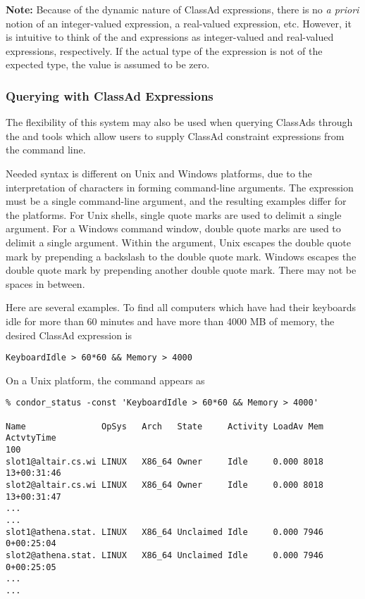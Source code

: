 \textbf{Note:}  Because of the dynamic nature of ClassAd expressions, there
is no \emph{a priori} notion of an integer-valued expression, a real-valued
expression, etc.  However, it is intuitive to think of the 
and  expressions as integer-valued and real-valued expressions,
respectively.  If the actual type of the expression is not of the expected 
type, the value is assumed to be zero.

\subsubsection{\label{sec:classad-query-examples}Querying with ClassAd Expressions}
The flexibility of this system may also be used when querying ClassAds
through the  and  tools which allow users to
supply ClassAd constraint expressions from the command line.

Needed syntax is different on Unix and Windows platforms, 
due to the interpretation of characters in forming command-line arguments.
The expression must be a single command-line argument,
and the resulting examples differ for the platforms.
For Unix shells,
single quote marks are used to delimit a single argument.
For a Windows command window,
double quote marks are used to delimit a single argument.
Within the argument,
Unix escapes the double quote mark by prepending a backslash to the double
quote mark.
Windows escapes the double quote mark by prepending another double
quote mark. There may not be spaces in between.

Here are several examples.
To find all computers which have had their keyboards idle for 
more than 60 minutes and have more than 4000 MB of memory,
the desired ClassAd expression is
\footnotesize
\begin{verbatim}
KeyboardIdle > 60*60 && Memory > 4000
\end{verbatim}
\normalsize
On a Unix platform, the command appears as
\footnotesize
\begin{verbatim}
% condor_status -const 'KeyboardIdle > 60*60 && Memory > 4000'

Name               OpSys   Arch   State     Activity LoadAv Mem  ActvtyTime
100
slot1@altair.cs.wi LINUX   X86_64 Owner     Idle     0.000 8018 13+00:31:46
slot2@altair.cs.wi LINUX   X86_64 Owner     Idle     0.000 8018 13+00:31:47
...
...
slot1@athena.stat. LINUX   X86_64 Unclaimed Idle     0.000 7946  0+00:25:04
slot2@athena.stat. LINUX   X86_64 Unclaimed Idle     0.000 7946  0+00:25:05
...
...
\end{verbatim}
\normalsize

